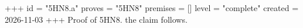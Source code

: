 +++
id = "5HN8.a"
proves = "5HN8"
premises = []
level = "complete"
created = 2026-11-03
+++
Proof of 5HN8. the claim follows.
